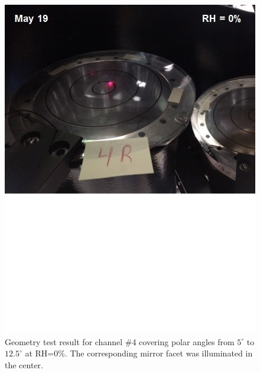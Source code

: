 \begin{figure}[ht]
    \centering
    \includegraphics[width=1.0\linewidth,trim={0 8.5cm 0 0},clip]{images/GEO_TEST_4_Zero.jpg}
    \caption{Geometry test result for channel \#4 covering polar angles from $5^\circ$ to $12.5^\circ$ at
      RH=0\%. The corresponding mirror facet was illuminated in the center.}
    \label{fig:GEO_TEST_4_Zero}
\end{figure}

